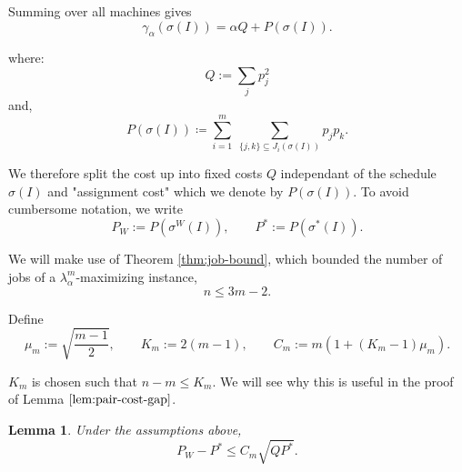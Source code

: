 \documentclass[%
english, titlepage=false %
]{./tum-templates/book/tumbook}
\newtheorem{lemma}{Lemma}
\begin{document}
\noindent
Summing over all machines gives
\begin{equation}
     \gamma_{\alpha}(\sigma(I))=\alpha Q+P(\sigma(I)).
     \label{eq: F,P,Q}
\end{equation}

\noindent
where:
\[
 Q:=\sum_jp_j^2
\]
and,
\[
 P(\sigma(I))\coloneqq
 \sum_{i=1}^m\ \sum_{\{j,k\}\subseteq J_i(\sigma(I))}p_jp_k.
\]

We therefore split the cost up into fixed costs $Q$ independant of the schedule $\sigma(I)$
and "assignment cost" which we denote by $P(\sigma(I))$.\medskip 
\noindent
To avoid cumbersome notation, we write
\[
 P_{W}:=P(\sigma^{W}(I)),\qquad P^*:=P(\sigma^{*}(I)).
\]

\noindent
We will make use of Theorem \ref{thm:job-bound}, which bounded the number of jobs of a $\lambda^{m}_{\alpha}$-maximizing instance,
\begin{equation}
 n\le 3m-2.
 \label{eq:job-number}
\end{equation}

\noindent
Define
\[
 \mu_m:=\sqrt{\frac{m-1}{2}},
 \qquad
 K_m:=2(m-1),
 \qquad
 C_m:=m\left(1+(K_m-1)\mu_m\right).
\]

$K_m$ is chosen such that $n-m \le K_m$. We will see why this is useful in the proof of Lemma $\ref{lem:pair-cost-gap}$.

\begin{lemma}
\label{lem:pair-cost-gap}
Under the assumptions above,
\begin{equation}
    P_{W}-P^*\le C_m\sqrt{QP^*}. 
    \label{eq:pair-cost-gap}
\end{equation} 
\end{lemma}
\end{document}
